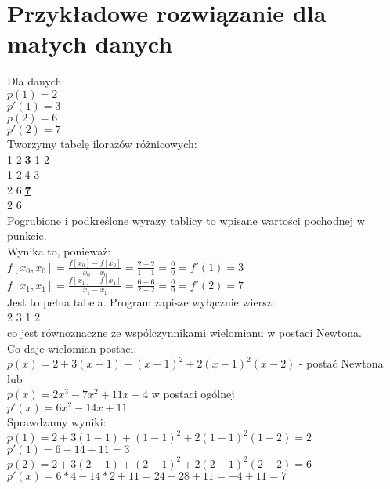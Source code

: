 \documentclass[16pt]{article} %
\begin{document}
\section{Przykładowe rozwiązanie dla małych danych}
Dla danych:\\
$p(1)=2$\\ $p'(1)=3$\\ $p(2)=6$\\ $p'(2)=7$\\
Tworzymy tabelę ilorazów różnicowych:\\
1 2|\textbf{\underline{3}} 1 2\\
1 2|4 3\\
2 6|\textbf{\underline{7}}\\
2 6|\\
Pogrubione i podkreślone wyrazy tablicy to wpisane wartości pochodnej w punkcie.\\
Wynika to, ponieważ:\\
$f[x_0,x_0]=\frac{f[x_0]-f[x_0]}{x_0-x_0} = \frac{2-2}{1-1} = \frac {0}{0} = f'(1) = 3$\\
$f[x_1,x_1]=\frac{f[x_1]-f[x_1]}{x_1-x_1} = \frac{6-6}{2-2} = \frac {0}{0} = f'(2) = 7$\\

Jest to pełna tabela. Program zapisze wyłącznie wiersz: \\
2 3 1 2 \\
co jest równoznaczne ze wspólczynnikami wielomianu w postaci Newtona.\\
Co daje wielomian postaci:\\
$p(x) = 2 + 3(x-1) + (x-1)^2 + 2(x-1)^{2}(x-2) $ - postać Newtona  \\
lub\\ $p(x) = 2x^3 - 7x^2 +11x -4$ w postaci ogólnej\\
$p'(x) = 6x^2 -14x +11$ \\
Sprawdzamy wyniki: \\
$p(1) = 2 + 3(1-1) + (1-1)^2 + 2(1-1)^{2}(1-2) = 2$\\
$p'(1) = 6-14+11=3$\\
$p(2) = 2 + 3(2-1) + (2-1)^2 + 2(2-1)^{2}(2-2) = 6$\\
$p'(x) = 6*4-14*2+11=24-28+11=-4+11=7$\\
\end{document}
